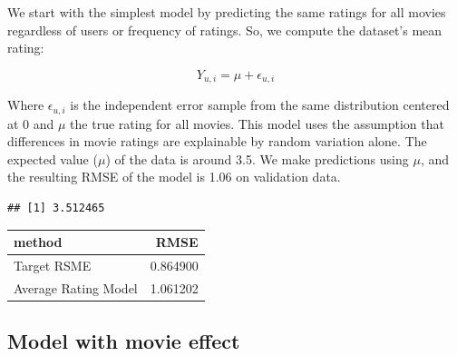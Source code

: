 \documentclass[]{article}
\newenvironment{Shaded}{\begin{snugshade}}{\end{snugshade}}
\newcommand{\CommentTok}[1]{\textcolor[rgb]{0.56,0.35,0.01}{\textit{#1}}}
\newcommand{\DataTypeTok}[1]{\textcolor[rgb]{0.13,0.29,0.53}{#1}}
\newcommand{\KeywordTok}[1]{\textcolor[rgb]{0.13,0.29,0.53}{\textbf{#1}}}
\newcommand{\NormalTok}[1]{#1}
\newcommand{\OperatorTok}[1]{\textcolor[rgb]{0.81,0.36,0.00}{\textbf{#1}}}
\newcommand{\StringTok}[1]{\textcolor[rgb]{0.31,0.60,0.02}{#1}}
\begin{document}
We start with the simplest model by predicting the same ratings for all
movies regardless of users or frequency of ratings. So, we compute the
dataset's mean rating:

\begin{equation}
Y_{u, i} = \mu + \epsilon_{u, i}
\end{equation}

Where \(\epsilon_{u,i}\) is the independent error sample from the same
distribution centered at 0 and \(\mu\) the true rating for all movies.
This model uses the assumption that differences in movie ratings are
explainable by random variation alone. The expected value (\(\mu\)) of
the data is around 3.5. We make predictions using \(\mu\), and the
resulting RMSE of the model is 1.06 on validation data.

\begin{Shaded}
\end{Shaded}

\begin{verbatim}
## [1] 3.512465
\end{verbatim}

\begin{Shaded}
\end{Shaded}

\begin{longtable}[]{@{}lr@{}}
\toprule
method & RMSE\tabularnewline
\midrule
\endhead
Target RSME & 0.864900\tabularnewline
Average Rating Model & 1.061202\tabularnewline
\bottomrule
\end{longtable}

\subsection{Model with movie effect}
\label{sec:mem}
\end{document}
